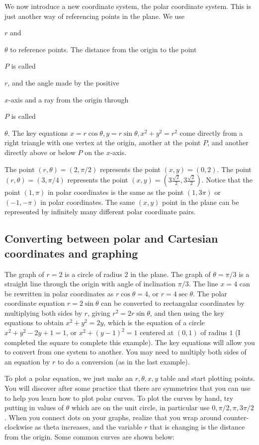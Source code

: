 We now introduce a new coordinate system, the polar coordinate system.  This is just another way of referencing points in the plane.  We use {$r$ and {$\theta$ to reference points.  The distance from the origin to the point {$P$ is called {$r$, and the angle made by the positive {$ x $-axis and a ray from the origin through {$ P $ is called {$ \theta $.  The key equations $ x=r\cos\theta, y=r\sin\theta , x^2+y^2=r^2$ come directly from a right triangle with one vertex at the origin, another at the point $P$, and another directly above or below $P$ on the $x$-axis. 

The point $(r,\theta) =(2, \pi/2)$ represents the point $(x,y)=(0,2)$. The point $(r,\theta) =(3, \pi/4)$ represents the point $(x,y)=(3\frac{\sqrt{2}}{2},3\frac{\sqrt{2}}{2})$. Notice that the point $(1,\pi)$ in polar coordinates is the same as the point $(1,3\pi)$ or $(-1,-\pi)$ in polar coordinates.  The same $(x,y)$ point in the plane can be represented by infinitely many different polar coordinate pairs.
\subsection{Converting between polar and Cartesian coordinates and graphing}
The graph of $r=2$ is a circle of radius $2$ in the plane.  The graph of $\theta =  \pi/3$ is a straight line through the origin with angle of inclination $\pi/3$.  The line $x=4$ can be rewritten in polar coordinates as $r\cos\theta = 4$, or $r=4\sec\theta$.  The polar coordinate equation $r=2\sin\theta $ can be converted to rectangular coordinates by multiplying both sides by $r$, giving $r^2 = 2r\sin\theta$, and then using the key equations to obtain $x^2+y^2 = 2y$, which is the equation of a circle $x^2+y^2-2y+1=1$, or $x^2+(y-1)^2=1$ centered at $(0,1)$ of radius $1$ (I completed the square to complete this example). The key equations will allow you to convert from one system to another. You may need to multiply both sides of an equation by $r$ to do a conversion (as in the last example).

To plot a polar equation, we just make an $r,\theta, x,y$ table and start plotting points.  You will discover after some practice that there are symmetries that you can use to help you learn how to plot polar curves.  To plot the curves by hand, try putting in values of $\theta$ which are on the unit circle, in particular use $0,\pi/2,\pi,3\pi/2$.  When you connect dots on your graphs, realize that you wrap around counter-clockwise as theta increases, and the variable $r$ that is changing is the distance from the origin.  Some common curves are shown below:

}}}}}}}
